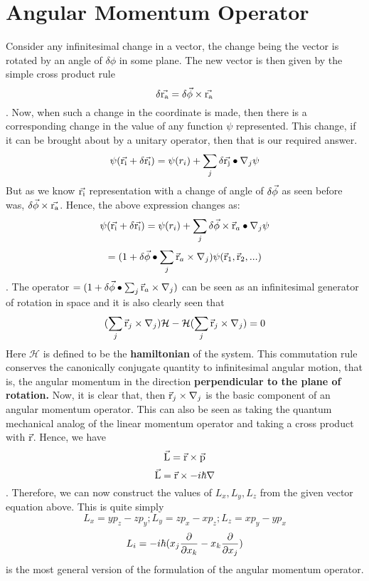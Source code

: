 \documentclass[12pt]{article}
\begin{document}
\section{Angular Momentum Operator}
Consider any infinitesimal change in a vector, the change being the vector is rotated by an angle of $\delta\phi$ in some plane. The new vector is then given by the simple cross product rule $$\delta\vec{\mathrm{r_{a}}} = {\delta\vec{\mathrm{\phi}}}\times{\ensuremath{\vec{\mathrm{r_{a}}}}}$$. Now, when such a change in the coordinate is made, then there is a corresponding change in the value of any function $\psi$ represented. This change, if it can be brought about by a unitary operator, then that is our required answer. $$\psi (\vec{\mathrm{r_{i}}}+\delta\vec{\mathrm{r_{i}}}) = \psi(r_{i}) + \sum_j \delta{\ensuremath{\vec{\mathrm{r_{j}}}}}\bullet{\ensuremath{\nabla}_{j}\psi}$$
But as we know $\vec{\mathrm{r_{i}}}$ representation with a change of angle of $\delta\vec{\mathrm{\phi}}$ as seen before was, ${\delta\vec{\mathrm{\phi}}}\times{\ensuremath{\vec{\mathrm{r_{a}}}}}$. Hence, the above expression changes as:	
$$\psi (\vec{\mathrm{r_{i}}}+\delta\vec{\mathrm{r_{i}}}) = \psi(r_{i}) + \sum_j {\delta\vec{\mathrm{\phi}}}\times{\ensuremath{{\vec{\mathrm{r}}_{a}}\bullet{\ensuremath{\nabla}_{j}\psi}}}$$
$$=(1+{\delta\vec{\mathrm{\phi}}}\bullet{\sum_j \ensuremath{{\vec{\mathrm{r}}_{a}}\times{\ensuremath{\nabla}_{j}}}})\psi(\vec{\mathrm{r}}_1,\vec{\mathrm{r}}_2,...)$$. The operator $=(1+{\delta\vec{\mathrm{\phi}}}\bullet{\sum_j \ensuremath{{\vec{\mathrm{r}}_{a}}\times{\ensuremath{\nabla}_{j}}}})$ can be seen as an infinitesimal generator of rotation in space and it is also clearly seen that $$(\sum_j{\vec{\mathrm{r}}_j}\times{\ensuremath{\nabla}_j})\mathcal{H}-\mathcal{H}(\sum_j{\vec{\mathrm{r}}_j}\times{\ensuremath{\nabla}_j}) = 0$$ Here $\mathcal{H}$ is defined to be the \textbf{hamiltonian} of the system. This commutation rule conserves the canonically conjugate quantity to infinitesimal angular motion, that is, the angular momentum in the direction \textbf{perpendicular to the plane of rotation.} Now, it is clear that, then ${\vec{\mathrm{r}}_j}\times{\ensuremath{\nabla}_j}$ is the basic component of an angular momentum operator. This can also be seen as taking the quantum mechanical analog of the linear momentum operator and taking a cross product with $\vec{\mathrm{r}}$. Hence, we have $$\vec{\mathrm{L}} = {\vec{\mathrm{r}}}\times{\ensuremath{\vec{\mathrm{p}}}}$$ $$\vec{\mathrm{L}} = {\vec{\mathrm{r}}}\times{-i\hbar\ensuremath{\nabla}}$$. Therefore, we can now construct the values of $L_x, L_y, L_z$ from the given vector equation above. This is quite simply
$$L_x = yp_z - zp_y; L_y = zp_x - xp_z; L_z = xp_y - yp_x$$
$$L_i = -i\hbar(x_j\frac{\partial{}}{\partial{x_k}} - x_k\frac{\partial{}}{\partial{x_j}})$$ is the most general version of the formulation of the angular momentum operator.
\end{document}
